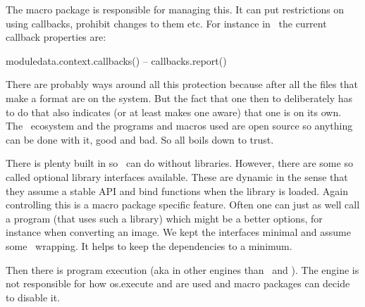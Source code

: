 The macro package is responsible for managing this. It can put restrictions on
using callbacks, prohibit changes to them etc. For instance in \CONTEXT\ the
current callback properties are:

\start \small \startluacode
    moduledata.context.callbacks()
 -- callbacks.report()
\stopluacode \stop

There are probably ways around all this protection because after all the files
that make a format are on the system. But the fact that one then to deliberately
has to do that also indicates (or at least makes one aware) that one is \quote
{on its own}. The \TEX\ ecosystem and the programs and macros used are open
source so anything can be done with it, good and bad. So all boils down to trust.

\stopsection

\startsection[title=Libraries]

There is plenty built in so \LUAMETATEX\ can do without libraries. However, there
are some so called optional library interfaces available. These are dynamic in the
sense that they assume a stable API and bind functions when the library is
loaded. Again controlling this is a macro package specific feature. Often one can
just as well call a program (that uses such a library) which might be a better
options, for instance when converting an image. We kept the interfaces minimal
and assume some \LUA\ wrapping. It helps to keep the dependencies to a minimum.

\stopsection

\startsection[title=Execution]

Then there is program execution (aka  in other engines than
\LUATEX\ and \LUAMETATEX). The engine is not responsible for how \typ
{os.execute} and  are used and macro packages can decide to
disable it.

\stopsection

\stopdocument
